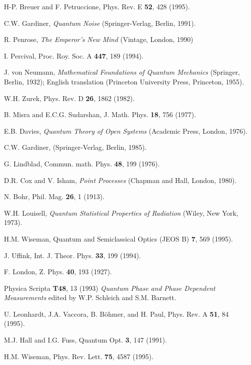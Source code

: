 \documentclass[12pt]{article}
\begin{document}
\begin{thebibliography}{99}
H-P. Breuer and F. Petruccione,
Phys. Rev. E {\bf 52}, 428 (1995).

C.W. Gardiner,
{\em Quantum Noise}
(Springer-Verlag, Berlin, 1991).

R. Penrose,
{\em The Emperor's New Mind}
(Vintage, London, 1990)

I. Percival,
Proc. Roy. Soc. A {\bf 447}, 189 (1994).

J. von Neumann, {\em Mathematical Foundations of Quantum Mechanics}
(Springer, Berlin, 1932);
English translation (Princeton University Press, Princeton, 1955).

W.H. Zurek,
Phys. Rev. D {\bf 26}, 1862 (1982).

B. Misra and E.C.G. Sudarshan,
J. Math. Phys. {\bf 18}, 756 (1977).

E.B. Davies,
{\em Quantum Theory of Open Systems}
(Academic Press, London, 1976).

C.W. Gardiner,
\newblock (Springer-Verlag, Berlin, 1985).

G. Lindblad,
Commun. math. Phys. {\bf 48}, 199 (1976).

D.R. Cox and V. Isham,
{\em Point Processes}
(Chapman and Hall, London, 1980).

N. Bohr, 
Phil. Mag. {\bf 26}, 1 (1913).

W.H. Louisell,
{\em Quantum Statistical Properties of Radiation}
(Wiley, New York, 1973).

H.M. Wiseman,
Quantum and Semiclassical Optics (JEOS B) {\bf 7}, 569 (1995).

J. Uffink,
Int. J. Theor. Phys. {\bf 33}, 199 (1994).

F. London, 
Z. Phys. {\bf 40}, 193 (1927).

Physica Scripta {\bf T48}, 13 (1993)
{\em Quantum Phase and Phase Dependent Measurements}
edited by W.P. Schleich and S.M. Barnett.

U. Leonhardt, J.A. Vaccora, B. B{\"o}hmer, and H. Paul,
Phys. Rev. A {\bf 51}, 84 (1995).

M.J. Hall and I.G. Fuss,
Quantum Opt. {\bf 3}, 147 (1991).

H.M. Wiseman,
Phys. Rev. Lett. {\bf 75}, 4587 (1995).


\end{thebibliography}

\newpage
\end{document}
